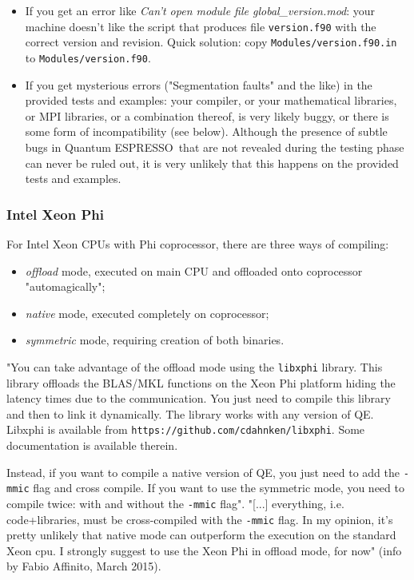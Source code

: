 \documentclass[12pt,a4paper]{article}
\def\qe{{\sc Quantum ESPRESSO}}
\begin{document}
\begin{itemize}
Note that \qe\ is self-contained (with the exception of MPI libraries for
parallel compilation): if system libraries are missing, the problem is in
your compiler/library combination or in their usage, not in \qe.
\item
If you get an error like {\em Can't open module file global\_version.mod}:
your machine doesn't like the script that produces file \texttt{version.f90}
with the correct version and revision. Quick solution: copy
\texttt{Modules/version.f90.in} to \texttt{Modules/version.f90}.
\item
If you get mysterious errors ("Segmentation faults" and the like)
in the provided tests and examples:
your compiler, or your mathematical libraries, or MPI libraries,
or a combination thereof, is very likely buggy, or there is some
form of incompatibility (see below). Although the
presence of subtle bugs in \qe\ that are not revealed during
the testing phase can never be ruled out, it is very unlikely
that this happens on the provided tests and examples.
\end{itemize}

\subsubsection{Intel Xeon Phi}
For Intel Xeon CPUs with Phi coprocessor, there are three ways of compiling:
\begin{itemize}
\item {\em offload} mode, executed on main CPU and offloaded onto coprocessor
"automagically";
\item {\em native} mode, executed completely on coprocessor;
\item {\em symmetric} mode, requiring creation of both binaries.
\end{itemize}
"You can take advantage of the offload mode using the \texttt{libxphi}
library. This library offloads the BLAS/MKL functions on the Xeon Phi
platform hiding the latency times due to the communication. You just
need to compile this library and then to link it dynamically. The
library works with any version of QE. Libxphi is available from
\texttt{https://github.com/cdahnken/libxphi}. Some documentation is
available therein.

Instead, if you want to compile a native version of QE, you just need
to add the \texttt{-mmic} flag and cross compile. If you want to use
the symmetric mode, you need to compile twice: with and without the
\texttt{-mmic} flag". "[...] everything, i.e. code+libraries, must be
cross-compiled with the \texttt{-mmic} flag. In my opinion, it's pretty
unlikely that native mode can outperform the execution on the standard
Xeon cpu. I strongly suggest to use the Xeon Phi in offload mode, for now"
(info by Fabio Affinito, March 2015).
\end{document}
